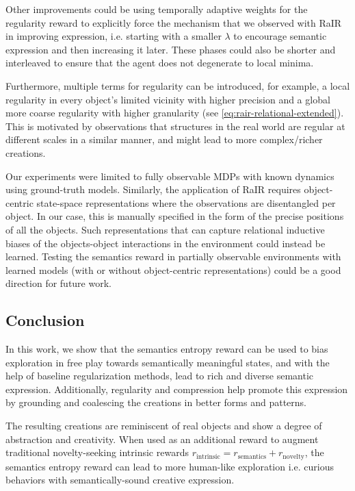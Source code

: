 Other improvements could be using temporally adaptive weights for the regularity reward to explicitly force the mechanism that we observed with RaIR in improving expression, i.e. starting with a smaller \(\lambda\) to encourage semantic expression and then increasing it later.
These phases could also be shorter and interleaved to ensure that the agent does not degenerate to local minima.

Furthermore, multiple terms for regularity can be introduced, for example, a local regularity in every object's limited vicinity with higher precision and a global more coarse regularity with higher granularity (see \eqref{eq:rair-relational-extended}).
This is motivated by observations that structures in the real world are regular at different scales in a similar manner, and might lead to more complex/richer creations.

Our experiments were limited to fully observable MDPs with known dynamics using ground-truth models.
Similarly, the application of RaIR requires object-centric state-space representations where the observations are disentangled per object.
In our case, this is manually specified in the form of the precise positions of all the objects.
Such representations that can capture relational inductive biases of the objects-object interactions in the environment could instead be learned.
Testing the semantics reward in partially observable environments with learned models (with or without object-centric representations) could be a good direction for future work.

\subsection*{Conclusion}
\label{sec:conclusion}
In this work, we show that the semantics entropy reward can be used to bias exploration in free play towards semantically meaningful states, and with the help of baseline regularization methods, lead to rich and diverse semantic expression.
Additionally, regularity and compression help promote this expression by grounding and coalescing the creations in better forms and patterns.

The resulting creations are reminiscent of real objects and show a degree of abstraction and creativity.
When used as an additional reward to augment traditional novelty-seeking intrinsic rewards \(r_{\text{intrinsic}} = r_{\text{semantics}} + r_{\text{novelty}}\), the semantics entropy reward can lead to more human-like exploration i.e. curious behaviors with semantically-sound creative expression.
